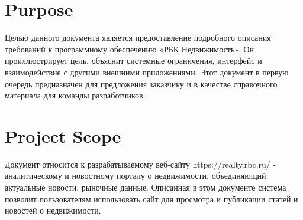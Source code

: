 \documentclass{scrreprt}
\begin{document}
\section{Purpose}
Целью данного документа является предоставление подробного описания требований к программному обеспечению «РБК Недвижимость». Он проиллюстрирует цель, объяснит системные ограничения, интерфейс и взаимодействие с другими
внешними приложениями. Этот документ в первую очередь предназначен для предложения заказчику и в качестве справочного материала для команды разработчиков.

\section{Project Scope}
Документ относится к разрабатываемому веб-сайту https://realty.rbc.ru/ - аналитическому и новостному порталу о недвижимости, объединяющий актуальные новости, рыночные данные. Описанная в этом документе система позволит пользователям использовать сайт для просмотра и публикации статей и новостей о недвижимости.
\end{document}
